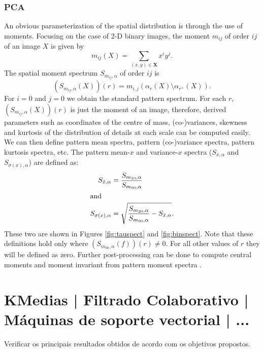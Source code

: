 \documentclass{sciposter}
\begin{document}
\begin{multicols}{3}
\subsubsection{PCA}
An obvious parameterization of the spatial distribution is through 
the use of moments. Focusing on the case of 2-D binary images, the 
moment $m_{ij}$ of order $ij$ of an image $X$ is given by
\begin{equation}
  m_{ij}(X) = \sum_{(x,y) \in \mathbf X} x^i y^j.
\end{equation}  
The spatial moment spectrum $S_{m_{ij},\alpha}$ of order $ij$ is
\begin{equation}
  (S_{m_{ij},\alpha}(X))(r) = m_{i,j}(\alpha_r(X) \setminus \alpha_{r^+}(X)).
\end{equation}  
For $i=0$ and $j=0$ we obtain the standard pattern spectrum. 
For each $r$, $(S_{m_{ij},\alpha}(X))(r)$ is just the moment of an image, 
therefore, derived parameters such as coordinates of the centre of mass, 
(co-)variances, skewness and kurtosis of the distribution of details at each
scale can be computed easily. We can then define pattern mean
spectra, pattern (co-)variance spectra, pattern kurtosis spectra, etc. The 
pattern mean-$x$ and variance-$x$ spectra 
($S_{\bar x,\alpha}$ and $S_{\sigma(x),\alpha}$) are defined as: 
\begin{align}
  S_{\bar x,\alpha} & = \frac{S_{m_{10},\alpha}} {S_{m_{00},\alpha}} \\
\intertext{and}
   S_{\sigma(x),\alpha} & = \sqrt{\frac{S_{m_{20},\alpha}}
                                 {S_{m_{00},\alpha}} 
                                 - S_{\bar x, \alpha}}.  
 \end{align}
These two are shown in Figures \ref{fig:tauspect} and \ref{fig:binspect}. Note that 
these definitions hold only where $(S_{m_{00},\alpha}(f))(r) \neq 0$. For all 
other values of $r$ they will be defined as zero. Further post-processing can
be done to compute central moments and moment invariant from pattern moment 
spectra \cite{Flusser:Suk:93,Hu:62}. 

\section{KMedias | Filtrado Colaborativo | M\'aquinas de soporte vectorial | ...}

Verificar os principais resultados obtidos de acordo com os objetivos propostos.\\


\end{multicols}
\end{document}
